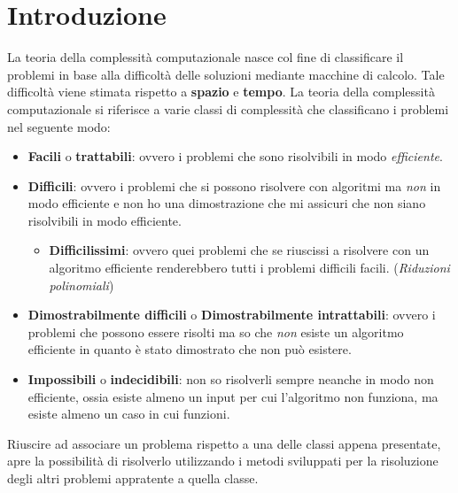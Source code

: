 \chapter{Introduzione}
La teoria della complessità computazionale nasce col fine di classificare il problemi in base alla difficoltà delle soluzioni mediante macchine di calcolo. Tale difficoltà viene stimata rispetto
a \textbf{spazio} e \textbf{tempo}. La teoria della complessità computazionale si riferisce a varie classi di complessità che classificano i problemi nel seguente modo:
\begin{itemize}
    \item \textbf{Facili} o \textbf{trattabili}: ovvero i problemi che sono risolvibili in modo \textit{efficiente}.
    \item \textbf{Difficili}: ovvero i problemi che si possono risolvere con algoritmi ma \textit{non} in modo efficiente e non ho una dimostrazione che mi assicuri che non siano risolvibili in modo efficiente. 
    \begin{itemize}
        \item \textbf{Difficilissimi}: ovvero quei problemi che se riuscissi a risolvere con un algoritmo efficiente renderebbero tutti i problemi difficili facili. (\textit{Riduzioni polinomiali})
    \end{itemize}
    \item \textbf{Dimostrabilmente difficili} o \textbf{Dimostrabilmente intrattabili}: ovvero i problemi che possono essere risolti ma so che \textit{non} esiste un algoritmo efficiente in quanto è stato dimostrato che non può esistere.
    \item \textbf{Impossibili} o \textbf{indecidibili}: non so risolverli sempre neanche in modo non efficiente, ossia esiste almeno un input per cui l'algoritmo non funziona, ma esiste almeno un caso in cui funzioni.
\end{itemize}

Riuscire ad associare un problema rispetto a una delle classi appena presentate, apre la possibilità di risolverlo utilizzando i metodi sviluppati per la risoluzione degli altri problemi appratente a quella classe.

